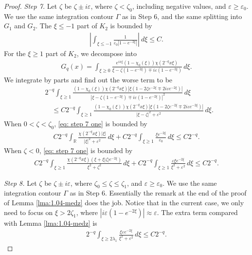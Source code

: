 \documentclass[GreensFunctions.tex]{subfiles}
\begin{document}
\begin{proof}
	{\em Step 7.}
	Let $\zeta$ be $\zeta\pm i\varepsilon$, where $\zeta<\zeta_0$, including negative 
	values, and $\varepsilon\ge\varepsilon_0$. We use the same integration contour 
	$\Gamma$ as in Step 6, and the same splitting into $G_1$ and $G_2$. The $\xi\le -1$ 
	part of $K_2$ is bounded by
	\begin{align*}
		\left|\int_{\xi\le -1}\frac{1}{\varepsilon_0|1-e^{-2\xi}|}\right|~d\xi
		\le C.	
	\end{align*}
	For the $\xi\ge 1$ part of $K_2$, we decompose into
	\begin{align*}
		G_q(x) 
			= 
				\int_{\xi\ge 0} 
					\frac{e^{ix\xi} (1-\chi_0(\xi))\chi(2^{-q}x\xi)}
						{\xi-\zeta(1-e^{-2\xi})\mp i\varepsilon(1-e^{-2\xi})}
				\,d\xi.
	\end{align*}
	We integrate by parts and find out the worse term to be
	\begin{align}
		&2^{-q}
			\int_{\xi\ge 1} 
				\frac{
					(1-\chi_0(\xi))\chi(2^{-q}x\xi)|\xi(1-2\zeta e^{-2\xi} 
					\mp 2i\varepsilon e^{-2\xi})|
				}{
					|\xi-\zeta(1-e^{-2\xi})\mp i\varepsilon(1-e^{-2\xi})|^2
				}
			\,d\xi
			\\
		&\quad\le
			C2^{-q}
			\int_{\xi\ge 1} 
				\frac{
					(1-\chi_0(\xi))\chi(2^{-q}x\xi)|\xi(1-2\zeta e^{-2\xi} 
					\mp 2i\varepsilon e^{-2\xi})|
				}{
					|\xi-\zeta|^2 +\varepsilon^2
				}
				\,d\xi. 
				\label{eq: step 7 one}
	\end{align}
	When $0<\zeta<\zeta_0$, \eqref{eq: step 7 one} is bounded by
	\begin{align*}
		C2^{-q}
		\int_{\mathbb R} 
			\frac{\chi(2^{-q}x\xi)|\xi|}
				{|\xi|^2+\varepsilon^2}
		\,d\xi 
		+ 
			C2^{-q}
			\int_{\xi\ge 1}
				\frac{\xi e^{-2\xi}}{\varepsilon_0}
			\,d\xi
		\le C2^{-q}.
	\end{align*}
	When $\zeta<0$, \eqref{eq: step 7 one} is bounded by
	\begin{align}
		C2^{-q}
		\int_{\xi\ge 1}
			\frac{\chi(2^{-q}x\xi)(\xi+\xi|\zeta| e^{-2\xi})}{\xi^2+\zeta^2}
		\,d\xi 
		+ C2^{-q}
			\int_{\xi\ge 1} 
				\frac{\varepsilon\xi e^{-2\xi}}{\xi^2+\varepsilon^2}
			\,d\xi
		\le C2^{-q}.
	\end{align}

	{\em Step 8.}
	Let $\zeta$ be $\zeta\pm i\varepsilon$, where $\zeta_0\le \zeta\le \zeta_1$, and 
	$\varepsilon\ge \varepsilon_0$. We use the same integration contour $\Gamma$ as in 
	Step 6. Essentially the remark at the end of the proof of Lemma \ref{lma:1.04-medz} 
	does the job. Notice that in the current case, we only need to focus on 
	$\xi> 2\zeta_1$, where $|i\varepsilon(1-e^{-2\xi})|\approx \varepsilon$. The extra 
	term compared with Lemma \ref{lma:1.04-medz} is
	\begin{align*}
		2^{-q}
		\int_{\xi\ge 2\lambda_1} 
			\frac{\xi\varepsilon e^{-2\xi}}{\xi^2+\varepsilon^2}
		\,d\xi
		\le C2^{-q}.	
	\end{align*}
\end{proof}
\end{document}
